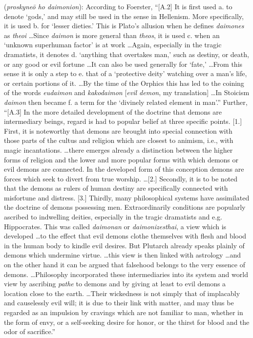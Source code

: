 \item[Demon worship,]

(\textit{proskyneō ho daimonion}):
According to Foerster, ``[A.2] It is first used a. to denote `gods,' and may still be used in the sense in Hellenism. More specifically, it is used b. for `lesser dieties.' This is Plato's allusion when he defines \emph{daimones} as \emph{theoi} \ldots Since \emph{daimon} is more general than \emph{theos}, it is used c. when an `unknown superhuman factor' is at work \ldots Again, especially in the tragic dramatists, it denotes d. `anything that overtakes man,' such as destiny, or death, or any good or evil fortune \ldots It can also be used generally for `fate,' \ldots From this sense it is only a step to e. that of a `protective deity' watching over a man's life, or certain portions of it. \ldots By the time of the Orphics this has led to the coining of the words \emph{eudaimon} and \emph{kakodaimon} [\emph{evil demon}, my translation] \ldots In Stoicism  \emph{daimon} then became f. a term for the `divinely related element in man'.'' 
Further, ``[A.3] In the more detailed development of the doctrine that demons are intermediary beings, regard is had to popular belief at three specific points. [1.] First, it is noteworthy that demons are brought into special connection with those parts of the cultus  and religion which are closest to animism, i.e., with magic incantations. \ldots there emerges already a distinction between the higher forms of religion and the lower and more popular forms with which demons or evil demons are connected. In the developed form of this conception demons are forces which seek to divert from true worship. \ldots [2.] Secondly, it is to be noted that the demons as rulers of human destiny are specifically connected with misfortune and distress. [3.] Thirdly, many philosophical systems have assimilated the doctrine of demons possessing men. Extraordinarily conditions are popularly ascribed to indwelling deities, especially in the tragic dramatists and e.g. Hippocrates. This was called \emph{daimonan} or \emph{daimonizesthai}, a view which is developed \ldots to the effect that evil demons clothe themselves with flesh and blood in the human body to kindle evil desires. But Plutarch already speaks plainly of demons which undermine virtue. \ldots this view is then linked with astrology \ldots and on the other hand it can be argued that falsehood belongs to the very essence of demons. \ldots Philosophy incorporated these intermediaries  into its system and world view by ascribing \emph{pathe} to demons and by giving at least to evil demons a location close to the earth. \ldots Their wickedness is not simply that of implacably and causelessly evil will; it is due to their link with matter, and may thus be regarded as an impulsion by cravings which are not familiar to man, whether in the form of envy, or a self-seeking desire for honor, or the thirst for blood and the odor of sacrifice.''
